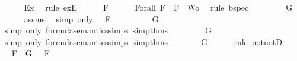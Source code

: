 \begin{isabellebody}
\ \ \ \ \isamarkupfalse%
\ Ex{}\ \isamarkupfalse%
\ {\isacharparenleft}rule\ exE{\isacharparenright}\isanewline
\ \ \isamarkupfalse%
\ {\isachardoublequoteopen}{\isasymA}\ {\isasymTurnstile}\ F{\isachardoublequoteclose}\isanewline
\ \ \ \ \isamarkupfalse%
\ Forall{}\ {\isacartoucheopen}F\ {\isasymin}\ {\isacharbraceleft}F{\isacharbraceright}\ {\isasymunion}\ Wo{\isacartoucheclose}\ \isamarkupfalse%
\ {\isacharparenleft}rule\ bspec{\isacharparenright}\isanewline
\ \ \isamarkupfalse%
\ \isamarkupfalse%
\ {\isachardoublequoteopen}{\isasymA}\ {\isasymTurnstile}\ \isactrlbold {\isasymnot}{\isacharparenleft}\isactrlbold {\isasymnot}\ G{\isacharparenright}{\isachardoublequoteclose}\isanewline
\ \ \ \ \isamarkupfalse%
\ assms{\isacharparenleft}{}{\isacharparenright}\ \isamarkupfalse%
\ {\isacharparenleft}simp\ only{\isacharcolon}\ {\isacartoucheopen}{\isasymA}\ {\isasymTurnstile}\ F{\isacartoucheclose}{\isacharparenright}\isanewline
\ \ \isamarkupfalse%
\ \isamarkupfalse%
\ {\isachardoublequoteopen}{\isasymnot}\ {\isasymA}\ {\isasymTurnstile}\ \isactrlbold {\isasymnot}\ G{\isachardoublequoteclose}\isanewline
\ \ \ \ \isamarkupfalse%
\ {\isacharparenleft}simp\ only{\isacharcolon}\ formula{\isacharunderscore}semantics{\isachardot}simps{\isacharparenleft}{}{\isacharparenright}\ simp{\isacharunderscore}thms{\isacharparenleft}{}{\isacharparenright}{\isacharparenright}\isanewline
\ \ \isamarkupfalse%
\ \isamarkupfalse%
\ {\isachardoublequoteopen}{\isasymnot}\ {\isasymnot}{\isasymA}\ {\isasymTurnstile}\ G{\isachardoublequoteclose}\isanewline
\ \ \ \ \isamarkupfalse%
\ {\isacharparenleft}simp\ only{\isacharcolon}\ formula{\isacharunderscore}semantics{\isachardot}simps{\isacharparenleft}{}{\isacharparenright}\ simp{\isacharunderscore}thms{\isacharparenleft}{}{\isacharparenright}{\isacharparenright}\isanewline
\ \ \isamarkupfalse%
\ \isamarkupfalse%
\ {\isachardoublequoteopen}{\isasymA}\ {\isasymTurnstile}\ G{\isachardoublequoteclose}\isanewline
\ \ \ \ \isamarkupfalse%
\ {\isacharparenleft}rule\ notnotD{\isacharparenright}\isanewline
\ \ \isamarkupfalse%
\ \isamarkupfalse%
\ {\isachardoublequoteopen}{\isasymforall}F\ {\isasymin}\ {\isacharbraceleft}G{\isacharbraceright}{\isachardot}\ {\isasymA}\ {\isasymTurnstile}\ F{\isachardoublequoteclose}\isanewline

\end{isabellebody}

